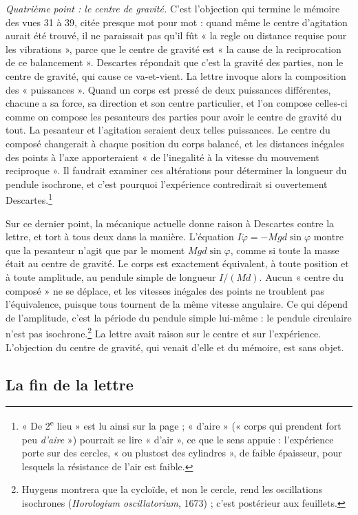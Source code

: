 \documentclass[11pt,a4paper]{article}
\begin{document}
\emph{Quatrième point : le centre de gravité.} C'est l'objection qui termine
le mémoire des vues 31 à 39, citée presque mot pour mot : quand même le centre
d'agitation aurait été trouvé, il ne paraissait pas qu'il fût « la regle ou
distance requise pour les vibrations », parce que le centre de gravité est « la
cause de la reciprocation de ce balancement ». Descartes répondait que c'est la
gravité des parties, non le centre de gravité, qui cause ce va-et-vient. La
lettre invoque alors la composition des « puissances ». Quand un corps est
pressé de deux puissances différentes, chacune a sa force, sa direction et son
centre particulier, et l'on compose celles-ci comme on compose les pesanteurs
des parties pour avoir le centre de gravité du tout. La pesanteur et
l'agitation seraient deux telles puissances. Le centre du composé changerait à
chaque position du corps balancé, et les distances inégales des points à l'axe
apporteraient « de l'inegalité à la vitesse du mouvement reciproque ». Il
faudrait examiner ces altérations pour déterminer la longueur du pendule
isochrone, et c'est pourquoi l'expérience contredirait si ouvertement
Descartes.\footnote{« De 2\textsuperscript{e} lieu » est lu ainsi sur la page ;
« d'aire » (« corps qui prendent fort peu \emph{d'aire} ») pourrait se lire
« d'air », ce que le sens appuie : l'expérience porte sur des cercles, « ou
plustost des cylindres », de faible épaisseur, pour lesquels la résistance de
l'air est faible.}

Sur ce dernier point, la mécanique actuelle donne raison à Descartes contre la
lettre, et tort à tous deux dans la manière. L'équation
\(I\ddot\varphi=-Mgd\sin\varphi\) montre que la pesanteur n'agit que par le
moment \(Mgd\sin\varphi\), comme si toute la masse était au centre de gravité.
Le corps est exactement équivalent, à toute position et à toute amplitude, au
pendule simple de longueur \(I/(Md)\). Aucun « centre du composé » ne se
déplace, et les vitesses inégales des points ne troublent pas l'équivalence,
puisque tous tournent de la même vitesse angulaire. Ce qui dépend de
l'amplitude, c'est la période du pendule simple lui-même : le pendule
circulaire n'est pas isochrone.\footnote{Huygens montrera que la cycloïde, et
non le cercle, rend les oscillations isochrones (\emph{Horologium
oscillatorium}, 1673) ; c'est postérieur aux feuillets.} La lettre avait
raison sur le centre et sur l'expérience. L'objection du centre de gravité, qui
venait d'elle et du mémoire, est sans objet.

\subsection*{La fin de la lettre}
\end{document}

